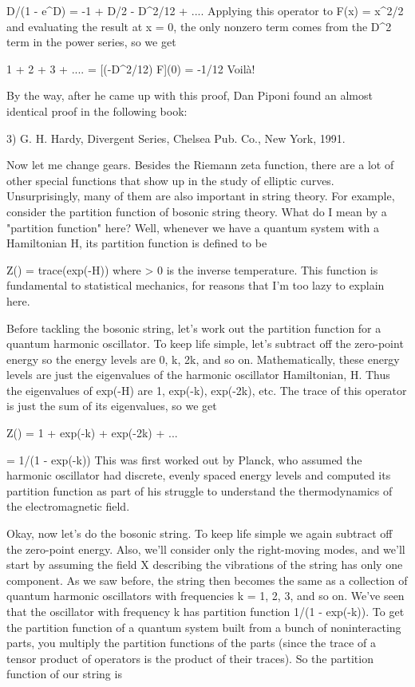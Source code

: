                   D/(1 - e^{D}) = -1 + D/2 - D^{2}/12 + ....
Applying this operator to F(x) = x^{2}/2 and evaluating the result at 
x = 0, the only nonzero term comes from the D^{2} term in the power 
series, so we get 

                1 + 2 + 3 + .... = [(-D^{2}/12) F](0) = -1/12
Voil\`{a}!  

By the way, after he came up with this proof, Dan Piponi found an
almost identical proof in the following book:

3) G. H. Hardy, Divergent Series, Chelsea Pub. Co., New York, 1991.

Now let me change gears.  Besides the Riemann zeta function, there are a
lot of other special functions that show up in the study of elliptic
curves.  Unsurprisingly, many of them are also important in string
theory.  For example, consider the partition function of bosonic string
theory.  What do I mean by a "partition function" here?  Well, whenever
we have a quantum system with a Hamiltonian H, its partition function is
defined to be

                         Z(\beta ) = trace(exp(-\beta H))
where \beta  > 0 is the inverse temperature.  This function is fundamental to
statistical mechanics, for reasons that I'm too lazy to explain here.

Before tackling the bosonic string, let's work out the partition function
for a quantum harmonic oscillator.  To keep life simple, let's subtract
off the zero-point energy so the energy levels are 0, k, 2k, and so on.
Mathematically, these energy levels are just the eigenvalues of the
harmonic oscillator Hamiltonian, H.  Thus the eigenvalues of exp(-\beta H)
are 1, exp(-\beta k), exp(-2\beta k), etc.  The trace of this operator is just 
the sum of its eigenvalues, so we get

           Z(\beta ) = 1 + exp(-\beta k) + exp(-2\beta k) + ...
       
                = 1/(1 - exp(-\beta k))
This was first worked out by Planck, who assumed the harmonic oscillator
had discrete, evenly spaced energy levels and computed its partition
function as part of his struggle to understand the thermodynamics of
the electromagnetic field.

Okay, now let's do the bosonic string.  To keep life simple we again
subtract off the zero-point energy.  Also, we'll consider only the
right-moving modes, and we'll start by assuming the field X describing
the vibrations of the string has only one component.  As we saw before,
the string then becomes the same as a collection of quantum harmonic
oscillators with frequencies k = 1, 2, 3, and so on.  We've seen that
the oscillator with frequency k has partition function 1/(1 - exp(-\beta k)).
To get the partition function of a quantum system built from a bunch of
noninteracting parts, you  multiply the partition functions of the parts
(since the trace of a tensor product of operators is the product of their 
traces).  So the partition function of our string is 
                
